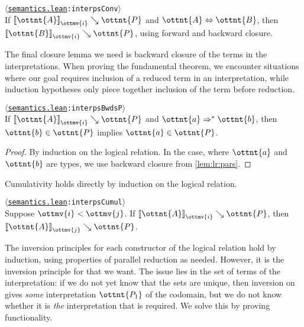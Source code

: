 \documentclass[a4paper,UKenglish,cleveref,autoref,thm-restate]{lipics-v2021}
\newcommand{\repo}{https://github.com/ionathanch/TTBFL}
\newcommand{\thmref}[2]{%
  $\langle$\href{\repo/tree/main/src/#1}{\texttt{#1}}\texttt{:#2}$\rangle$%
}
\begin{document}
\begin{corollary}[Conversion (l.r.)] \thmref{semantics.lean}{interpsConv} \\
  If $ \mathopen{\llbracket}  \ottnt{A}  \mathclose{\rrbracket}_{ \ottmv{i} } \searrow  \ottnt{P} $ and $ \ottnt{A}  \Leftrightarrow  \ottnt{B} $,
  then $ \mathopen{\llbracket}  \ottnt{B}  \mathclose{\rrbracket}_{ \ottmv{i} } \searrow  \ottnt{P} $,
  using forward and backward closure.
\end{corollary}

The final closure lemma we need is backward closure of the terms in the interpretations.
When proving the fundamental theorem,
we encounter situations where our goal requires inclusion of a reduced term in an interpretation,
while induction hypotheses only piece together inclusion of the term before reduction.

\begin{lemma} \thmref{semantics.lean}{interpsBwdsP} \label{lem:lr:back} \\
  If $ \mathopen{\llbracket}  \ottnt{A}  \mathclose{\rrbracket}_{ \ottmv{i} } \searrow  \ottnt{P} $ and $ \ottnt{a}  \Rightarrow^\ast  \ottnt{b} $,
  then $ \ottnt{b}  \in  \ottnt{P} $ implies $ \ottnt{a}  \in  \ottnt{P} $.
\end{lemma}

\begin{proof}
  By induction on the logical relation.
  In the  case, where $\ottnt{a}$ and $\ottnt{b}$ are types,
  we use backward closure from \cref{lem:lr:pars}.
\end{proof}

Cumulativity holds directly by induction on the logical relation.

\begin{lemma}[Cumulativity (l.r.)] \thmref{semantics.lean}{interpsCumul} \label{lem:lr:cumul} \\
  Suppose $ \ottmv{i}  <  \ottmv{j} $. If $ \mathopen{\llbracket}  \ottnt{A}  \mathclose{\rrbracket}_{ \ottmv{i} } \searrow  \ottnt{P} $, then $ \mathopen{\llbracket}  \ottnt{A}  \mathclose{\rrbracket}_{ \ottmv{j} } \searrow  \ottnt{P} $.
\end{lemma}

The inversion principles for each constructor of the logical relation
hold by induction, using properties of parallel reduction as needed.
However, it is the inversion principle for  that we want.
The issue lies in the set of terms of the interpretation:
if we do not yet know that the sets are unique,
then inversion on  gives \emph{some} interpretation $\ottnt{P_{{\mathrm{1}}}}$ of the codomain,
but we do not know whether it is \emph{the} interpretation that is required.
We solve this by proving functionality.
\end{document}
